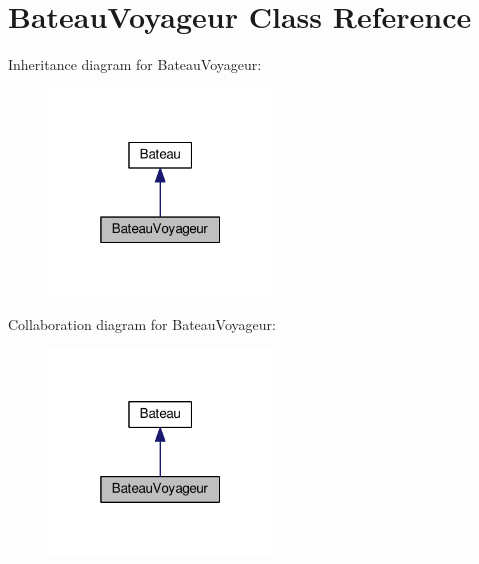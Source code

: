\hypertarget{class_bateau_voyageur}{}\section{Bateau\+Voyageur Class Reference}
\label{class_bateau_voyageur}


Inheritance diagram for Bateau\+Voyageur\+:\nopagebreak
\begin{figure}[H]
\begin{center}
\leavevmode
\includegraphics[width=169pt]{class_bateau_voyageur__inherit__graph}
\end{center}
\end{figure}


Collaboration diagram for Bateau\+Voyageur\+:\nopagebreak
\begin{figure}[H]
\begin{center}
\leavevmode
\includegraphics[width=169pt]{class_bateau_voyageur__coll__graph}
\end{center}
\end{figure}
